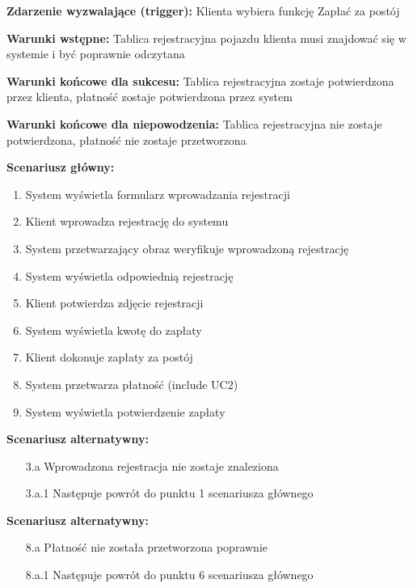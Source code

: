 \hspace{0cm}\textbf{Zdarzenie wyzwalające (trigger): }Klienta wybiera funkcję Zapłać za postój

\hspace{0cm}\textbf{Warunki wstępne: }Tablica rejestracyjna pojazdu klienta musi znajdować się w systemie i być poprawnie odczytana

\hspace{0cm}\textbf{Warunki końcowe dla sukcesu: }
Tablica rejestracyjna zostaje potwierdzona przez klienta, płatność zostaje potwierdzona przez system

\hspace{0cm}\textbf{Warunki końcowe dla niepowodzenia: }Tablica rejestracyjna nie zostaje potwierdzona, płatność nie zostaje przetworzona \newline

\hspace{0cm}\textbf{Scenariusz główny: }
\begin{enumerate}
\item System wyświetla formularz wprowadzania rejestracji
\item Klient wprowadza rejestrację do systemu
\item System przetwarzający obraz weryfikuje wprowadzoną rejestrację
\item System wyświetla odpowiednią rejestrację
\item Klient potwierdza zdjęcie rejestracji
\item System wyświetla kwotę do zapłaty
\item Klient dokonuje zapłaty za postój
\item System przetwarza płatność (include UC2)
\item System wyświetla potwierdzenie zapłaty
\end{enumerate}
\hspace{0cm}\textbf{Scenariusz alternatywny: }
\begin{enumerate}
\item[3.a] Wprowadzona rejestracja nie zostaje znaleziona
\item[3.a.1] Następuje powrót do punktu 1 scenariusza głównego 
\end{enumerate}
\hspace{0cm}\textbf{Scenariusz alternatywny: }
\begin{enumerate}
\item[8.a] Płatność nie została przetworzona poprawnie
\item[8.a.1] Następuje powrót do punktu 6 scenariusza głównego 
\end{enumerate}
